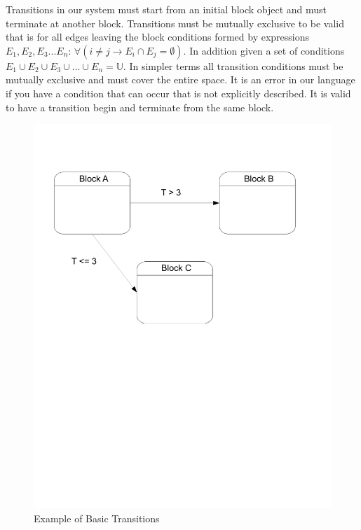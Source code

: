 Transitions in our system must start from an initial block object and must terminate at another block. Transitions must be mutually exclusive to be valid that is for all edges leaving the block conditions formed by expressions $E_1, E_2, E_3...E_n$: $\forall(i \neq j \rightarrow E_i \cap E_j = \emptyset)$. In addition given a set of conditions $E_1 \cup E_2 \cup E_3 \cup ... \cup E_n = \mathbb{U}$. In simpler terms all transition conditions must be mutually exclusive and must cover the entire space. It is an error in our language if you have a condition that can occur that is not explicitly described. It is valid to have a transition begin and terminate from the same block. 

\begin{figure}[htp]
    \centering
    \includegraphics[trim= 10mm 130mm 20mm 10mm, clip, width=\imgmedium]{./images/state_transition.pdf}
    \caption{Example of Basic Transitions}
    \label{fig:state_transition}
\end{figure}




